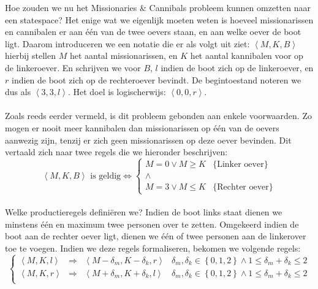 \begin{leftbar}
Hoe zouden we nu het Missionaries \& Cannibals probleem kunnen omzetten naar een statespace? Het enige wat we eigenlijk moeten weten is hoeveel missionarissen en cannibalen er aan één van de twee oevers staan, en aan welke oever de boot ligt. Daarom introduceren we een notatie die er als volgt uit ziet: $\left\langle M,K,B\right\rangle$ hierbij stellen $M$ het aantal missionarissen, en $K$ het aantal kannibalen voor op de linkeroever. En schrijven we voor $B$, $l$ indien de boot zich op de linkeroever, en $r$ indien de boot zich op de rechteroever bevindt. De begintoestand noteren we dus als $\left\langle3,3,l\right\rangle$. Het doel is logischerwijs: $\left\langle0,0,r\right\rangle$.
\paragraph{}
Zoals reeds eerder vermeld, is dit probleem gebonden aan enkele voorwaarden. Zo mogen er nooit meer kannibalen dan missionarissen op één van de oevers aanwezig zijn, tenzij er zich geen missionarissen op deze oever bevinden. Dit vertaald zich naar twee regels die we hieronder beschrijven:
\begin{equation}
\left\langle M,K,B\right\rangle\mbox{ is geldig}\Leftrightarrow\left\{
\begin{array}{cl}
M=0\vee M\geq K&\mbox{\{Linker oever\}}\\
\wedge\\
M=3\vee M\leq K&\mbox{\{Rechter oever\}}
\end{array}\right.
\end{equation}
\paragraph{}
Welke productieregels definiëren we? Indien de boot links staat dienen we minstens één en maximum twee personen over te zetten. Omgekeerd indien de boot aan de rechter oever ligt, dienen we één of twee personen aan de linkerover toe te voegen. Indien we deze regels formaliseren, bekomen we volgende regels:
\begin{equation}
\left\{\begin{array}{rcl|l}
\left\langle M,K,l\right\rangle&\Rightarrow&\left\langle M-\delta_m,K-\delta_k,r\right\rangle&\delta_m,\delta_k\in\left\{0,1,2\right\}\wedge1\leq\delta_m+\delta_k\leq 2\\
\left\langle M,K,r\right\rangle&\Rightarrow&\left\langle M+\delta_m,K+\delta_k,l\right\rangle&\delta_m,\delta_k\in\left\{0,1,2\right\}\wedge1\leq\delta_m+\delta_k\leq 2\\
\end{array}\right.
\end{equation}
\end{leftbar}
